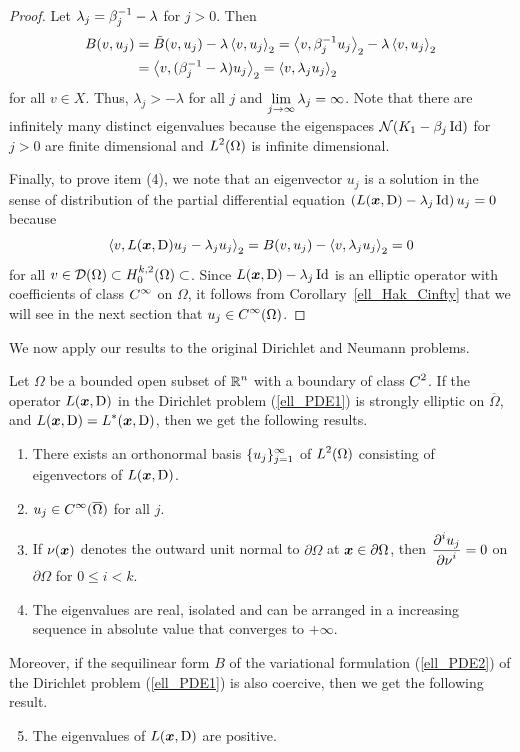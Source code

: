 \begin{proof}
Let $\displaystyle \lambda_j = \beta_j^{-1}-\lambda$ for $j>0$.  Then 
\begin{align*}
B(v,u_j) &= \tilde{B}(v,u_j) - \lambda \left\langle{v} , {u_j}\right\rangle_2
=\left\langle{v} , {\beta_j^{-1}u_j}\right\rangle_2 - \lambda \left\langle{v} , {u_j}\right\rangle_2 \\
&= \left\langle{v} , {(\beta_j^{-1}-\lambda)u_j}\right\rangle_2 = \left\langle{v} , {\lambda_j u_j}\right\rangle_2
\end{align*}
for all $v \in X$.  Thus, $\lambda_j > -\lambda$ for all $j$ and
$\displaystyle \lim_{j\rightarrow \infty} \lambda_j = \infty$.
Note that there are infinitely many distinct eigenvalues because the
eigenspaces $\mathcal{N}(K_1-\beta_j \operatorname{Id})$ for $j>0$ are
finite dimensional and $\displaystyle L^2(\Omega)$ is infinite dimensional.

Finally, to prove item (4), we note that an
eigenvector $u_j$ is a solution in the sense of distribution of the
partial differential equation
$\displaystyle \left(L({\bm{x}},\operatorname{D}) - \lambda_j \operatorname{Id} \right)u_j = 0$
because
\[
\left\langle{v} , {L({\bm{x}},\operatorname{D})u_j - \lambda_j u_j}\right\rangle_2
= B(v,u_j) - \left\langle{v} , {\lambda_j u_j}\right\rangle_2 = 0
\]
for all
$\displaystyle v \in \mathcal{D}(\Omega) \subset H^{k,2}_0(\Omega) \subset$.  Since
$L({\bm{x}},\operatorname{D}) - \lambda_j \operatorname{Id}$ is an elliptic operator with
coefficients of class $\displaystyle C^\infty$ on $\Omega$, it follows from
Corollary~\ref{ell_Hak_Cinfty} that we will see in the next section
that $\displaystyle u_j \in C^\infty(\Omega)$.
\end{proof}

We now apply our results to the original Dirichlet and Neumann
problems.

\begin{theorem}  \label{ell_exist_th4}
Let $\Omega$ be a bounded open subset of $\displaystyle \mathbb{R}^n$ with a
boundary of class $\displaystyle C^2$.  If the operator
$L({\bm{x}},\operatorname{D})$ in the Dirichlet problem
(\ref{ell_PDE1}) is strongly elliptic on $\overline{\Omega}$, and
$\displaystyle L({\bm{x}},\operatorname{D})=L^\ast({\bm{x}},\operatorname{D})$, then we get the
following results.
\begin{enumerate}
\item There exists an orthonormal basis $\displaystyle \{u_j\}_{j=1}^\infty$ of
$\displaystyle L^2(\Omega)$ consisting of eigenvectors of $L({\bm{x}},\operatorname{D})$.
\item $\displaystyle u_j \in C^\infty(\overline{\Omega})$ for all $j$.
\item If $\nu({\bm{x}})$ denotes the outward unit normal to
$\partial \Omega$ at ${\bm{x}} \in \partial \Omega$, then
$\displaystyle \frac{\displaystyle \partial^{i}{u_j}} {\displaystyle \partial \nu^{i}}=0$ on $\partial \Omega$
for $0 \leq i < k$.
\item The eigenvalues are real, isolated and can be arranged in a
increasing sequence in absolute value that converges to $+\infty$.
\end{enumerate}
Moreover, if the sequilinear form $B$ of the variational formulation
(\ref{ell_PDE2}) of the Dirichlet problem (\ref{ell_PDE1}) is
also coercive, then we get the following result.
\begin{enumerate}
\setcounter{enumi}{4}
\item The eigenvalues of $L({\bm{x}},\operatorname{D})$ are positive.
\end{enumerate}
\end{theorem}

